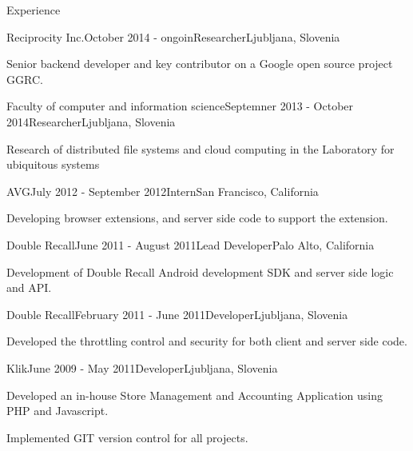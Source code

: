 \documentclass{resume} %
\begin{document}
\begin{rSection}{Experience}

\begin{rSubsection}{Reciprocity Inc.}{October 2014 - ongoin}{Researcher}{Ljubljana, Slovenia}
\item Senior backend developer and key contributor on a Google open source project GGRC.
\end{rSubsection}


\begin{rSubsection}{Faculty of computer and information science}{Septemner 2013 - October 2014}{Researcher}{Ljubljana, Slovenia}
\item Research of distributed file systems and cloud computing in the Laboratory for ubiquitous systems
\end{rSubsection}


\begin{rSubsection}{AVG}{July 2012 - September 2012}{Intern}{San Francisco, California}
\item Developing browser extensions, and server side code to support the extension.
\end{rSubsection}


\begin{rSubsection}{Double Recall}{June 2011 - August 2011}{Lead Developer}{Palo Alto, California}
\item Development of Double Recall Android development SDK and server side logic and API.
\end{rSubsection}


\begin{rSubsection}{Double Recall}{February 2011 - June 2011}{Developer}{Ljubljana, Slovenia}
\item Developed the throttling control and security for both client and server side code.
\end{rSubsection}


\begin{rSubsection}{Klik}{June 2009 - May 2011}{Developer}{Ljubljana, Slovenia}
\item Developed an in-house Store Management and Accounting Application using PHP and Javascript.
\item Implemented GIT version control for all projects.
\end{rSubsection}


\end{rSection}
\end{document}
